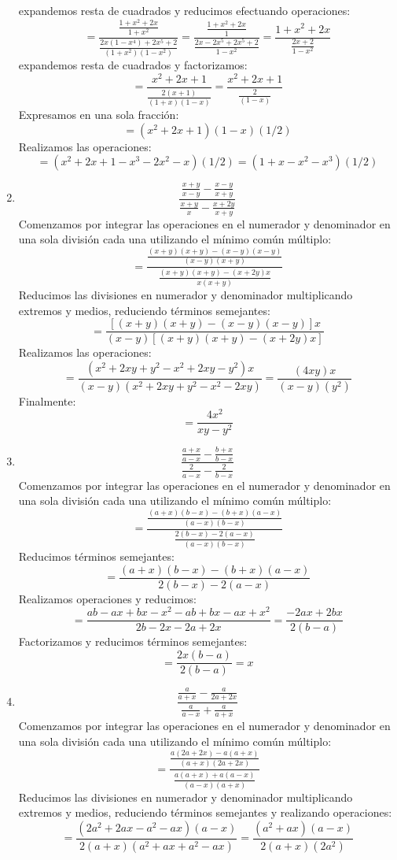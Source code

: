 \documentclass[12pt]{article}
\begin{document}
\begin{enumerate}[label=\bfseries Ejercicio \arabic*:]
expandemos resta de cuadrados y reducimos efectuando operaciones:
$$= \frac{\frac{1 + x^2 + 2x}{1 + x^2}}{\frac{2x(1 - x^4)+ 2x^5 + 2}{(1 + x^2)(1 - x^2)}} = \frac{\frac{1 + x^2 + 2x}{1}}{\frac{2x - 2x^5+ 2x^5 + 2}{1 - x^2}} = \frac{1 + x^2 + 2x}{\frac{2x + 2}{1 - x^2}}$$
expandemos resta de cuadrados y factorizamos:
$$= \frac{x^2 + 2x +1}{\frac{2(x + 1)}{(1 + x)(1 - x)}} = \frac{x^2 + 2x +1}{\frac{2}{(1 - x)}}$$
Expresamos en una sola fracción:
$$= (x^2 + 2x +1)(1-x)(1/2)$$
Realizamos las operaciones:
$$= (x^2 + 2x +1 - x^3 - 2x^2 - x)(1/2) = (1 + x - x^2 - x^3)(1/2)$$
  \item $$\frac{\frac{x + y}{x - y} - \frac{x - y}{x + y}}{\frac{x + y}{x} - \frac{x + 2y}{x + y}}$$
Comenzamos por integrar las operaciones en el numerador y denominador en una sola división cada una utilizando el mínimo común múltiplo:
$$= \frac{\frac{(x + y)(x + y) - (x - y)(x - y)}{(x - y)(x + y)}}{\frac{(x + y)(x + y) - (x + 2y)x}{x(x + y)}}$$
Reducimos las divisiones en numerador y denominador multiplicando extremos y medios, reduciendo términos semejantes:
$$= \frac{[(x + y)(x + y) - (x - y)(x - y)]x}{(x - y)[(x + y)(x + y) - (x + 2y)x]}$$
Realizamos las operaciones:
$$= \frac{(x^2 + 2xy + y^2 - x^2 + 2xy - y^2)x}{(x - y)(x^2 + 2xy + y^2 - x^2 - 2xy)} = \frac{(4xy)x}{(x - y)(y^2)}$$
Finalmente:
$$= \frac{4x^2}{xy - y^2}$$
  \item $$\frac{\frac{a + x}{a - x} - \frac{b + x}{b - x}}{\frac{2}{a - x} - \frac{2}{b -x}}$$
Comenzamos por integrar las operaciones en el numerador y denominador en una sola división cada una utilizando el mínimo común múltiplo:
$$= \frac{\frac{(a + x)(b - x) - (b + x)(a - x)}{(a - x)(b - x)}}{\frac{2(b - x) - 2(a - x)}{(a - x)(b - x)}}$$
Reducimos términos semejantes:
$$= \frac{(a + x)(b - x) - (b + x)(a - x)}{2(b - x) - 2(a - x)}$$
Realizamos operaciones y reducimos:
$$= \frac{ab - ax + bx - x^2 - ab + bx - ax + x^2}{2b - 2x - 2a + 2x} = \frac{-2ax + 2bx }{2(b - a)}$$
Factorizamos y reducimos términos semejantes:
$$= \frac{2x(b - a)}{2(b - a)} = x$$
  \item $$\frac{\frac{a}{a + x} - \frac{a}{2a + 2x}}{\frac{a}{a - x} + \frac{a}{a + x}}$$
Comenzamos por integrar las operaciones en el numerador y denominador en una sola división cada una utilizando el mínimo común múltiplo:
$$= \frac{\frac{a(2a + 2x) - a(a + x)}{(a + x)(2a + 2x)}}{\frac{a(a + x) + a(a - x)}{(a - x)(a + x)}}$$
Reducimos las divisiones en numerador y denominador multiplicando extremos y medios, reduciendo términos semejantes y realizando operaciones:
$$= \frac{(2a^2 + 2ax - a^2 - ax)(a - x)}{2(a + x)(a^2 + ax + a^2 - ax)} = \frac{(a^2 + ax)(a - x)}{2(a + x)(2a^2)}$$

\end{enumerate}
\end{document}
